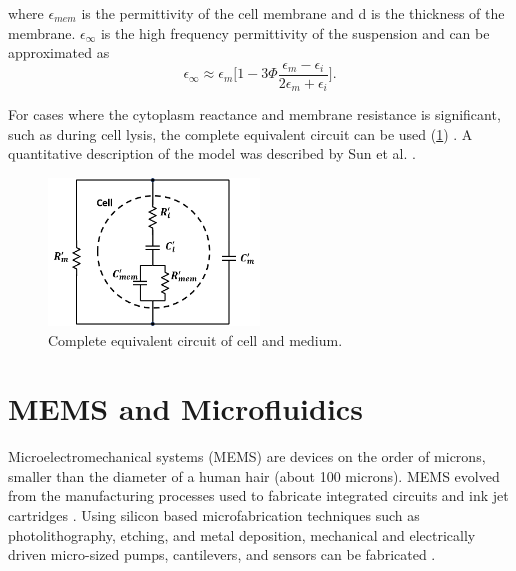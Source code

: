  \noindent where $\epsilon_{mem}$ is the permittivity of the cell membrane and d is the thickness of the membrane. $\epsilon_\infty$ is the high frequency permittivity of the suspension and can be approximated as
 \begin{equation}
     \epsilon_\infty \approx \epsilon_m \bigg[1-3\Phi\frac{\epsilon_m-\epsilon_i}{2\epsilon_m+\epsilon_i}\bigg].
 \end{equation}
 
 \par For cases where the cytoplasm reactance and membrane resistance is significant, such as during cell lysis, the complete equivalent circuit can be used (\ref{fig:complete_equiv_circuit_cell_medium}) \cite{sun_single-cell_2010}. A quantitative description of the model was described by Sun et al. \cite{sun_dielectric_2007}.

 \begin{figure}
     \centering
     \includegraphics[width=0.5\textwidth]{images/completeCellMediumCircuit.png}
     \caption{Complete equivalent circuit of cell and medium.}
     \label{fig:complete_equiv_circuit_cell_medium}
 \end{figure}
 
 \section[MEMs and Microfluidics]{MEMS and Microfluidics}
 
 \par Microelectromechanical systems (MEMS) are devices on the order of microns, smaller than the diameter of a human hair (about 100 microns). MEMS evolved from the manufacturing processes used to fabricate integrated circuits and ink jet cartridges \cite{xia_soft_1998-1}. Using silicon based microfabrication techniques such as photolithography, etching, and metal deposition, mechanical and electrically driven micro-sized pumps, cantilevers, and sensors can be fabricated \cite{wang_bio-mems:_2006}. 
 
